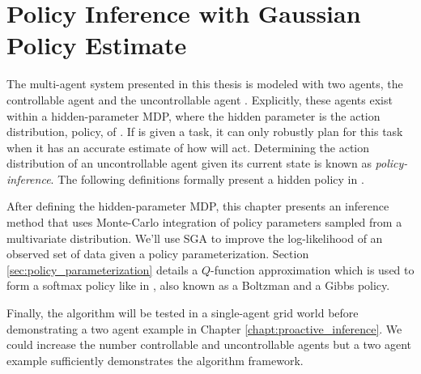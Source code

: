 %
%
\chapter{Policy Inference with Gaussian Policy Estimate}\label{chapt:gauss_policy}

    The multi-agent system presented in this thesis is modeled with two agents, the controllable agent  and the
    uncontrollable agent . Explicitly, these agents exist within a hidden-parameter \ac{MDP}, where the hidden
    parameter is the action distribution, policy, of . If  is given a task, it can only robustly plan
    for this task when it has an accurate estimate of how  will act. Determining the action distribution of an
    uncontrollable agent given its current state is known as \textit{policy-inference}. The following definitions
    formally present a hidden policy in .

    After defining the hidden-parameter MDP, this chapter presents an inference method that uses Monte-Carlo integration
    of policy parameters sampled from a multivariate distribution. We'll use \ac{SGA} to improve the log-likelihood of
    an observed set of data given a policy parameterization. Section \ref{sec:policy_parameterization} details a
    $Q$-function approximation which is used to form a softmax policy like in \cite{something}, also known as a Boltzman
    \cite{something-else} and a Gibbs \cite{another} policy.

    Finally, the algorithm
    will be tested in a single-agent grid world before demonstrating a two agent example in Chapter
    \ref{chapt:proactive_inference}. We could increase the number controllable and uncontrollable agents but a two agent
    example sufficiently demonstrates the algorithm framework.


